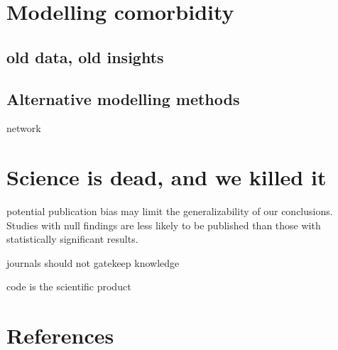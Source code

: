 \documentclass[
  letterpaper,
  DIV=11,
  numbers=noendperiod]{scrreport}
\begin{document}
\section{Modelling comorbidity}\label{modelling-comorbidity}

\subsection{old data, old insights}\label{old-data-old-insights}

\subsection{Alternative modelling
methods}\label{alternative-modelling-methods-1}

network

\section{Science is dead, and we killed
it}\label{science-is-dead-and-we-killed-it}

potential publication bias may limit the generalizability of our
conclusions. Studies with null findings are less likely to be published
than those with statistically significant results.

journals should not gatekeep knowledge

code is the scientific product

\section*{References}\label{references-7}

\end{document}
